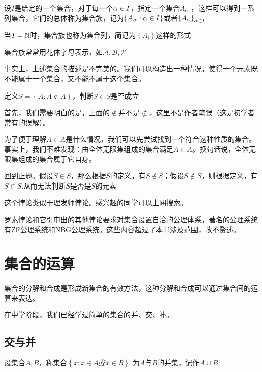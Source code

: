 \begin{definition}[集合族]
    设$I$是给定的一个集合，对于每一个$\alpha \in I$，指定一个集合$A_\alpha$ ，这样可以得到一系列集合，它们的总体称为集合族，记为$\left\{A_\alpha : \alpha \in I \right\}$或者$\left\{A_\alpha \right\}_{\alpha \in I}$

    当$I=\mathbb{N}$时，集合族也称为集合列，简记为$\left\{A_i \right\}$这样的形式

    集合族常常用花体字母表示，如$\mathcal{A},\mathcal{B} ,\mathcal{P} $ 
\end{definition}

事实上，上述集合的描述是不完美的。我们可以构造出一种情况，使得一个元素既不能属于一个集合，又不能不属于这个集合。

\begin{example}[罗素悖论]
    定义$S=\left\{A:A\notin A \right\}$，判断$S\in S$是否成立
\end{example}

首先，我们需要明白的是，上面的$\notin$并不是$\nsubset$，这里不是作者笔误（这是初学者常有的误解）。

为了便于理解$A \in A$是什么情况，我们可以先尝试找到一个符合这种性质的集合。事实上，我们不难发现：由全体无限集组成的集合满足$A\in A$。换句话说，全体无限集组成的集合属于它自身。

回到正题。假设$S\in S$，那么根据$S$的定义，有$S \notin S$；假设$S \notin S$，则根据定义，有$S \in S$.从而无法判断$S$是否是$S$的元素

这个悖论类似于理发师悖论。感兴趣的同学可以上网搜索。

罗素悖论和它引申出的其他悖论要求对集合设置自洽的公理体系，著名的公理系统有ZF公理系统和NBG公理系统。这些内容超过了本书涉及范围，故不赘述。

\section{集合的运算}

集合的分解和合成是形成新集合的有效方法，这种分解和合成可以通过集合间的运算来表达。

在中学阶段，我们已经学过简单的集合的并、交、补。

\subsection{交与并}

\begin{definition}
    设集合$A,B$，称集合$\left\{x: x\in A \text{或} x \in B \right\}$ 为$A$与$B$的并集，记作$A \cup B$.
\end{definition}

